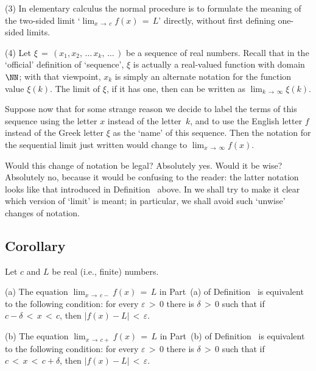 \V

        (3) In elementary calculus the normal procedure is to formulate the meaning of the two-sided limit
    `$\lim_{x \,{\rightarrow}\, c} f(x) \,=\, L$' directly, without first defining one-sided limits.

\V

        (4) Let ${\xi} \,=\, (x_{1},x_{2},\,{\ldots}\,x_{k},\,{\ldots}\,)$ be a sequence of real numbers.
    Recall that in the `official' definition of `sequence', ${\xi}$ is actually a real-valued function with domain~${\NN}$;
    with that viewpoint, $x_{k}$ is simply an alternate notation for the function value ${\xi}(k)$.
    The limit of ${\xi}$, if it has one, then can be written as $\lim_{k \,{\rightarrow}\, {\infty}} {\xi}(k)$.

        Suppose now that for some strange reason we decide to label the terms of this sequence using the letter $x$ instead of the letter~$k$,
    and to use the English letter $f$ instead of the Greek letter ${\xi}$ as the `name' of this sequence.
    Then the notation for the sequential limit just written would change to $\lim_{x \,{\rightarrow}\, {\infty}} f(x)$.

        Would this change of notation be legal? Absolutely yes. Would it be wise? Absolutely no, because it would be confusing to the reader:
    the latter notation looks like that introduced in Definition~ above.
    In {\ThisText} we shall try to make it clear which version of `limit' is meant; in particular, we shall avoid such `unwise' changes of notation.

\V

            \subsection{\small{\bf Corollary}}
            \label{CorD50.40}


\V

        Let $c$ and $L$ be real (i.e., finite) numbers.

\V

        (a) The equation $\lim_{x \,{\rightarrow}\, c-} f(x) \,=\, L$ in Part~(a) of Definition~
    is equivalent to the following condition: for every ${\varepsilon}\,>\,0$ there is ${\delta}\,>\,0$ such that if $c-{\delta}\,<\,x\,<\,c$,
    then $|f(x)-L|\,<\,{\varepsilon}$.

\V

        (b) The equation $\lim_{x \,{\rightarrow}\, c+} f(x) \,=\, L$ in Part~(b) of Definition~
    is equivalent to the following condition: for every ${\varepsilon}\,>\,0$ there is ${\delta}\,>\,0$ such that if $c\,<\,x\,<\,c+{\delta}$,
    then $|f(x)-L|\,<\,{\varepsilon}$.

